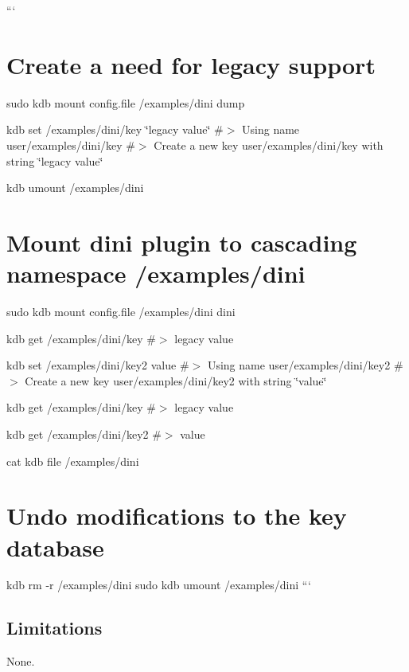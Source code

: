 ``` \section*{Create a need for legacy support}

sudo kdb mount config.\+file /examples/dini dump

kdb set /examples/dini/key \char`\"{}legacy value\char`\"{} \#$>$ Using name user/examples/dini/key \#$>$ Create a new key user/examples/dini/key with string \char`\"{}legacy value\char`\"{}

kdb umount /examples/dini

\section*{Mount dini plugin to cascading namespace {\ttfamily /examples/dini}}

sudo kdb mount config.\+file /examples/dini dini

kdb get /examples/dini/key \#$>$ legacy value

kdb set /examples/dini/key2 value \#$>$ Using name user/examples/dini/key2 \#$>$ Create a new key user/examples/dini/key2 with string \char`\"{}value\char`\"{}

kdb get /examples/dini/key \#$>$ legacy value

kdb get /examples/dini/key2 \#$>$ value

cat {\ttfamily kdb file /examples/dini}

\section*{Undo modifications to the key database}

kdb rm -\/r /examples/dini sudo kdb umount /examples/dini ```

\subsection*{Limitations}

None. 